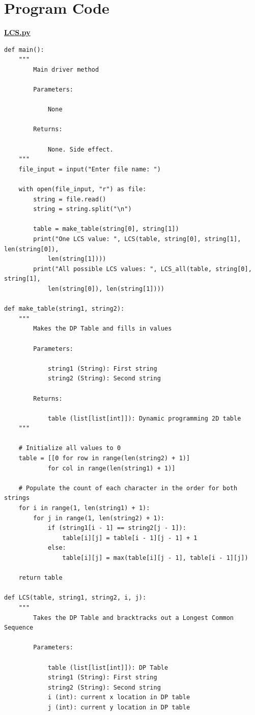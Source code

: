 \documentclass{article}
\begin{document}
\pagebreak

\section*{Program Code}
\textbf{\underline{LCS.py}}
\begin{lstlisting}
def main():
    """
        Main driver method

        Parameters:

            None

        Returns:

            None. Side effect.
    """
    file_input = input("Enter file name: ")

    with open(file_input, "r") as file:
        string = file.read()
        string = string.split("\n")

        table = make_table(string[0], string[1])
        print("One LCS value: ", LCS(table, string[0], string[1], len(string[0]),
        	len(string[1])))
        print("All possible LCS values: ", LCS_all(table, string[0], string[1],
         	len(string[0]), len(string[1])))

def make_table(string1, string2):
    """
        Makes the DP Table and fills in values

        Parameters:

            string1 (String): First string
            string2 (String): Second string

        Returns:

            table (list[list[int]]): Dynamic programming 2D table
    """

    # Initialize all values to 0
    table = [[0 for row in range(len(string2) + 1)]
    		for col in range(len(string1) + 1)]

    # Populate the count of each character in the order for both strings
    for i in range(1, len(string1) + 1):
        for j in range(1, len(string2) + 1):
            if (string1[i - 1] == string2[j - 1]):
                table[i][j] = table[i - 1][j - 1] + 1
            else:
                table[i][j] = max(table[i][j - 1], table[i - 1][j])

    return table

def LCS(table, string1, string2, i, j):
    """
        Takes the DP Table and bracktracks out a Longest Common Sequence

        Parameters:

            table (list[list[int]]): DP Table
            string1 (String): First string
            string2 (String): Second string
            i (int): current x location in DP table
            j (int): current y location in DP table


\end{lstlisting}
\end{document}
